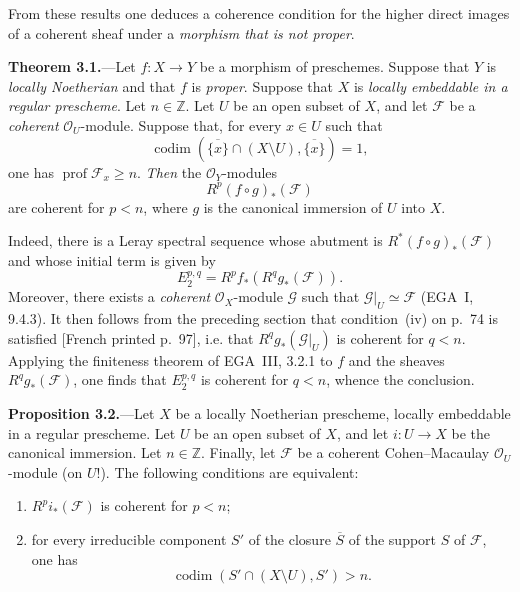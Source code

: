\documentclass[11pt,a4paper,oneside]{book}
\providecommand{\cF}{\mathcal F}
\providecommand{\cG}{\mathcal G}
\providecommand{\cO}{\mathcal O}
\providecommand{\prof}{\operatorname{prof}}
\providecommand{\codimn}{\operatorname{codim}}
\theoremstyle{plain}
\theoremstyle{definition}
\theoremstyle{remark}
\begin{document}
\noindent From these results one deduces a coherence condition for the higher
direct images of a coherent sheaf under a \emph{morphism that is not proper}.

\medskip
{}\noindent\textbf{Theorem 3.1.}---Let $f\colon X\to Y$ be a morphism of
preschemes. Suppose that $Y$ is \emph{locally Noetherian} and that $f$ is
\emph{proper}. Suppose that $X$ is \emph{locally embeddable in a regular
prescheme}. Let $n\in\mathbb Z$. Let $U$ be an open subset of $X$, and let
$\cF$ be a \emph{coherent} $\cO_U$-module. Suppose that, for every $x\in U$
such that
\[
  \codimn(\overline{\{x\}}\cap(X\setminus U),
  \overline{\{x\}})=1,
\]
one has $\prof\cF_x\geq n$. \emph{Then} the $\cO_Y$-modules
\[
  R^p(f\circ g)_*(\cF)
\]
are coherent for $p<n$, where $g$ is the canonical immersion of $U$ into
$X$.

\medskip
\noindent Indeed, there is a Leray spectral sequence whose abutment is
$R^*(f\circ g)_*(\cF)$ and whose initial term is given by
\[
  E_2^{p,q}=R^p f_*(R^q g_*(\cF)).
\]
Moreover, there exists a \emph{coherent} $\cO_X$-module $\cG$ such that
$\cG|_U\simeq\cF$ (EGA~I, 9.4.3). It then follows from the preceding section
that condition~\textup{(iv)} on p.~74 is satisfied
{\scriptsize\color{gray}[French printed p.~97]}, i.e. that
$R^q g_*(\cG|_U)$ is coherent for $q<n$. Applying the finiteness theorem of
EGA~III, 3.2.1 to $f$ and the sheaves $R^q g_*(\cF)$, one finds that
$E_2^{p,q}$ is coherent for $q<n$, whence the conclusion.


\medskip
{}\noindent\textbf{Proposition 3.2.}---Let $X$ be a locally Noetherian
prescheme, locally embeddable in a regular prescheme. Let $U$ be an open
subset of $X$, and let $i\colon U\to X$ be the canonical immersion. Let
$n\in\mathbb Z$. Finally, let $\cF$ be a coherent Cohen--Macaulay
$\cO_U$-module (on $U$!). The following conditions are equivalent:
\begin{enumerate}
\item[(a)] $R^p i_*(\cF)$ is coherent for $p<n$;
\item[(b)] for every irreducible component $S'$ of the closure $\overline S$
of the support $S$ of $\cF$, one has
\[
  \codimn(S'\cap(X\setminus U),S')>n.
\]
\end{enumerate}
\end{document}
